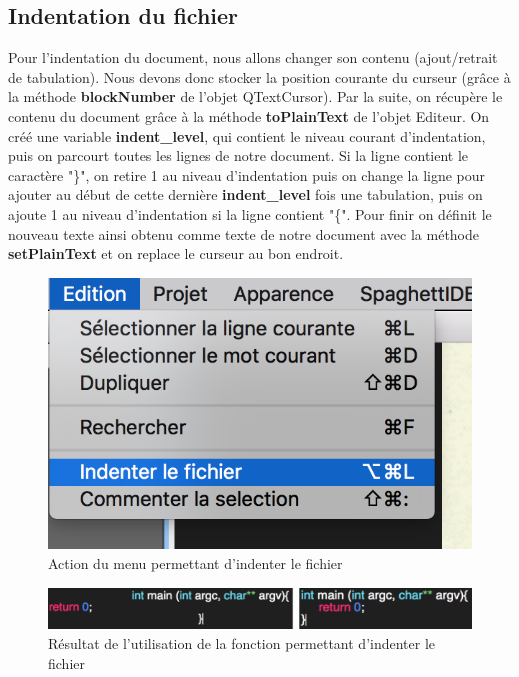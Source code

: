 \documentclass[a4paper,12pt]{article}
\begin{document}
	\subsection{Indentation du fichier}

	Pour l'indentation du document, nous allons changer son contenu (ajout/retrait de tabulation). Nous devons donc stocker la position courante du curseur (grâce à la méthode \textbf{blockNumber} de l'objet QTextCursor). Par la suite, on récupère le contenu du document grâce à la méthode \textbf{toPlainText} de l'objet Editeur. On créé une variable \textbf{indent\_level}, qui contient le niveau courant d'indentation, puis on parcourt toutes les lignes de notre document. Si la ligne contient le caractère "\}", on retire 1 au niveau d'indentation puis on change la ligne pour ajouter au début de cette dernière \textbf{indent\_level} fois une tabulation, puis on ajoute 1 au niveau d'indentation si la ligne contient "\{".
	Pour finir on définit le nouveau texte ainsi obtenu comme texte de notre document avec la méthode \textbf{setPlainText} et on replace le curseur au bon endroit.

	\begin{figure}[h!]

		\begin{center}
			\includegraphics[scale=0.5]{images/imgs_edit/utilisation_indentation}
			\caption{Action du menu permettant d'indenter le fichier}
		\end{center}
	\end{figure}

	\begin{figure}[h!]
		\begin{center}
			\includegraphics[scale=0.8]{images/imgs_edit/resultat_indentation}
			\caption{Résultat de l'utilisation de la fonction permettant d'indenter le fichier}
		\end{center}
	\end{figure}
	
\end{document}
